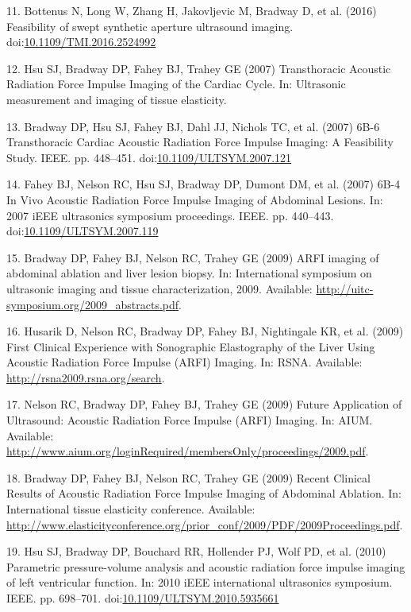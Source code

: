 \documentclass[]{article}
\begin{document}
11. Bottenus N, Long W, Zhang H, Jakovljevic M, Bradway D, et al. (2016)
Feasibility of swept synthetic aperture ultrasound imaging.
doi:\href{http://dx.doi.org/10.1109/TMI.2016.2524992}{10.1109/TMI.2016.2524992}

12. Hsu SJ, Bradway DP, Fahey BJ, Trahey GE (2007) Transthoracic
Acoustic Radiation Force Impulse Imaging of the Cardiac Cycle. In:
Ultrasonic measurement and imaging of tissue elasticity.

13. Bradway DP, Hsu SJ, Fahey BJ, Dahl JJ, Nichols TC, et al. (2007)
6B-6 Transthoracic Cardiac Acoustic Radiation Force Impulse Imaging: A
Feasibility Study. IEEE. pp. 448--451.
doi:\href{http://dx.doi.org/10.1109/ULTSYM.2007.121}{10.1109/ULTSYM.2007.121}

14. Fahey BJ, Nelson RC, Hsu SJ, Bradway DP, Dumont DM, et al. (2007)
6B-4 In Vivo Acoustic Radiation Force Impulse Imaging of Abdominal
Lesions. In: 2007 iEEE ultrasonics symposium proceedings. IEEE. pp.
440--443.
doi:\href{http://dx.doi.org/10.1109/ULTSYM.2007.119}{10.1109/ULTSYM.2007.119}

15. Bradway DP, Fahey BJ, Nelson RC, Trahey GE (2009) ARFI imaging of
abdominal ablation and liver lesion biopsy. In: International symposium
on ultrasonic imaging and tissue characterization, 2009. Available:
\url{http://uitc-symposium.org/2009_abstracts.pdf}.

16. Husarik D, Nelson RC, Bradway DP, Fahey BJ, Nightingale KR, et al.
(2009) First Clinical Experience with Sonographic Elastography of the
Liver Using Acoustic Radiation Force Impulse (ARFI) Imaging. In: RSNA.
Available: \url{http://rsna2009.rsna.org/search}.

17. Nelson RC, Bradway DP, Fahey BJ, Trahey GE (2009) Future Application
of Ultrasound: Acoustic Radiation Force Impulse (ARFI) Imaging. In:
AIUM. Available:
\url{http://www.aium.org/loginRequired/membersOnly/proceedings/2009.pdf}.

18. Bradway DP, Fahey BJ, Nelson RC, Trahey GE (2009) Recent Clinical
Results of Acoustic Radiation Force Impulse Imaging of Abdominal
Ablation. In: International tissue elasticity conference. Available:
\url{http://www.elasticityconference.org/prior_conf/2009/PDF/2009Proceedings.pdf}.

19. Hsu SJ, Bradway DP, Bouchard RR, Hollender PJ, Wolf PD, et al.
(2010) Parametric pressure-volume analysis and acoustic radiation force
impulse imaging of left ventricular function. In: 2010 iEEE
international ultrasonics symposium. IEEE. pp. 698--701.
doi:\href{http://dx.doi.org/10.1109/ULTSYM.2010.5935661}{10.1109/ULTSYM.2010.5935661}
\end{document}
